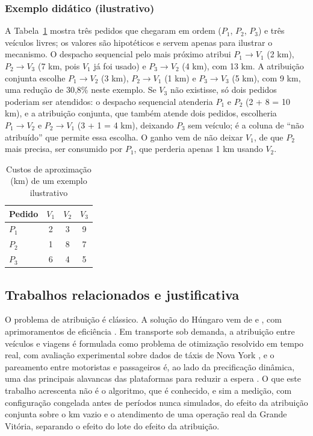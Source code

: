 \subsubsection{Exemplo didático (ilustrativo)}

A Tabela~\ref{tab:exemplo} mostra três pedidos que chegaram em ordem ($P_1$, $P_2$, $P_3$) e três veículos livres; os valores são hipotéticos e servem apenas para ilustrar o mecanismo. O despacho sequencial pelo mais próximo atribui $P_1\to V_1$ (2 km), $P_2\to V_3$ (7 km, pois $V_1$ já foi usado) e $P_3\to V_2$ (4 km), com 13 km. A atribuição conjunta escolhe $P_1\to V_2$ (3 km), $P_2\to V_1$ (1 km) e $P_3\to V_3$ (5 km), com 9 km, uma redução de 30,8\% neste exemplo. Se $V_3$ não existisse, só dois pedidos poderiam ser atendidos: o despacho sequencial atenderia $P_1$ e $P_2$ (2 + 8 = 10 km), e a atribuição conjunta, que também atende dois pedidos, escolheria $P_1\to V_2$ e $P_2\to V_1$ (3 + 1 = 4 km), deixando $P_3$ sem veículo; é a coluna de \enquote{não atribuído} que permite essa escolha. O ganho vem de não deixar $V_1$, de que $P_2$ mais precisa, ser consumido por $P_1$, que perderia apenas 1 km usando $V_2$.

\begin{table}[!htb]
\caption{Custos de aproximação (km) de um exemplo ilustrativo}\label{tab:exemplo}
\centering\fontetabela
\begin{tabular}{lccc}
\toprule
Pedido & $V_1$ & $V_2$ & $V_3$ \\
\midrule
$P_1$ & 2 & 3 & 9 \\
$P_2$ & 1 & 8 & 7 \\
$P_3$ & 6 & 4 & 5 \\
\bottomrule
\end{tabular}
\end{table}

\subsection{Trabalhos relacionados e justificativa}

O problema de atribuição é clássico. A solução do Húngaro vem de  e , com aprimoramentos de eficiência \cite{tomizawa1971, edmondskarp1972, jonker1987, crouse2016}. Em transporte sob demanda, a atribuição entre veículos e viagens é formulada como problema de otimização resolvido em tempo real, com avaliação experimental sobre dados de táxis de Nova York \cite{alonsomora2017}, e o pareamento entre motoristas e passageiros é, ao lado da precificação dinâmica, uma das principais alavancas das plataformas para reduzir a espera \cite{yan2020}. O que este trabalho acrescenta não é o algoritmo, que é conhecido, e sim a medição, com configuração congelada antes de períodos nunca simulados, do efeito da atribuição conjunta sobre o km vazio e o atendimento de uma operação real da Grande Vitória, separando o efeito do lote do efeito da atribuição.

